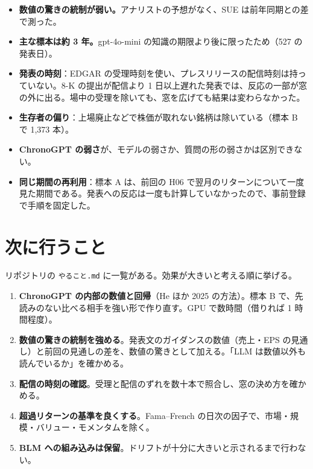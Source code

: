 \documentclass[xelatex,ja=standard,jafont=haranoaji,a4paper,10pt,openany]{bxjsreport}
\newcommand{\code}[1]{\texttt{#1}}
\begin{document}
\begin{itemize}
\item \textbf{数値の驚きの統制が弱い。}アナリストの予想がなく、SUE は前年同期との差で測った。
\item \textbf{主な標本は約 3 年。}gpt-4o-mini の知識の期限より後に限ったため（527 の発表日）。
\item \textbf{発表の時刻}：EDGAR の受理時刻を使い、プレスリリースの配信時刻は持っていない。8-K の提出が配信より 1 日以上遅れた発表では、反応の一部が窓の外に出る。場中の受理を除いても、窓を広げても結果は変わらなかった。
\item \textbf{生存者の偏り}：上場廃止などで株価が取れない銘柄は除いている（標本 B で 1,373 本）。
\item \textbf{ChronoGPT の弱さ}が、モデルの弱さか、質問の形の弱さかは区別できない。
\item \textbf{同じ期間の再利用}：標本 A は、前回の H06 で翌月のリターンについて一度見た期間である。発表への反応は一度も計算していなかったので、事前登録で手順を固定した。
\end{itemize}

\chapter{次に行うこと}\label{ch:next}

リポジトリの \code{やること.md} に一覧がある。効果が大きいと考える順に挙げる。

\begin{enumerate}
\item \textbf{ChronoGPT の内部の数値と回帰}（He ほか 2025 の方法）。標本 B で、先読みのない比べる相手を強い形で作り直す。GPU で数時間（借りれば 1 時間程度）。
\item \textbf{数値の驚きの統制を強める}。発表文のガイダンスの数値（売上・EPS の見通し）と前回の見通しの差を、数値の驚きとして加える。「LLM は数値以外も読んでいるか」を確かめる。
\item \textbf{配信の時刻の確認}。受理と配信のずれを数十本で照合し、窓の決め方を確かめる。
\item \textbf{超過リターンの基準を良くする}。Fama--French の日次の因子で、市場・規模・バリュー・モメンタムを除く。
\item \textbf{BLM への組み込みは保留}。ドリフトが十分に大きいと示されるまで行わない。
\end{enumerate}

\appendix
\end{document}
